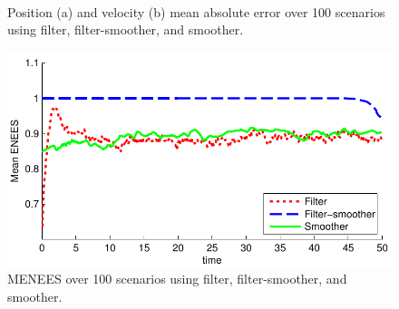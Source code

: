 \documentclass[10pt,twocolumn,twoside]{IEEEtran}
\begin{document}
%
\begin{figure}[!t]
\centering
{} \\
\caption{Position (a) and velocity (b) mean absolute error over 100 scenarios using filter, filter-smoother, and smoother.}
\label{fig:tracking_rmse}
\end{figure}
%
\begin{figure}[!t]
\centering
\includegraphics[width=0.9\columnwidth]{tracking_menees.pdf}
\caption{MENEES over 100 scenarios using filter, filter-smoother, and smoother.}
\label{fig:tracking_menees}
\end{figure}
\end{document}
